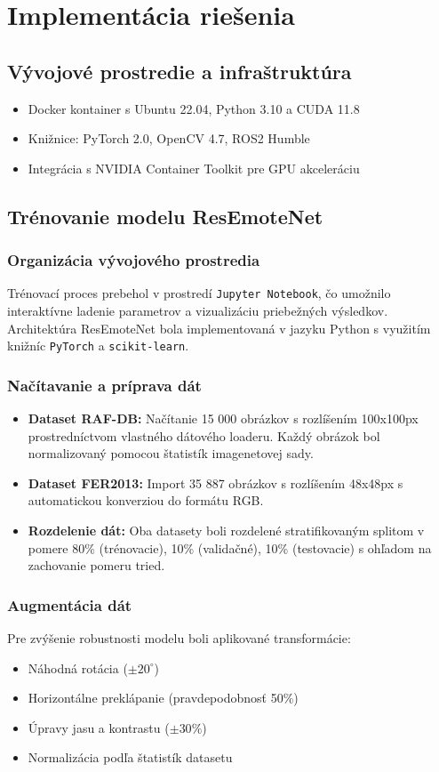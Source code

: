 \section{Implementácia riešenia}
\label{sec:implementation}
\subsection{Vývojové prostredie a infraštruktúra}
\begin{itemize}
\item Docker kontainer s Ubuntu 22.04, Python 3.10 a CUDA 11.8
\item Knižnice: PyTorch 2.0, OpenCV 4.7, ROS2 Humble
\item Integrácia s NVIDIA Container Toolkit pre GPU akceleráciu
\end{itemize}

\subsection{Trénovanie modelu ResEmoteNet}
\subsubsection{Organizácia vývojového prostredia}
Trénovací proces prebehol v prostredí \texttt{Jupyter Notebook}, čo umožnilo interaktívne ladenie parametrov a vizualizáciu priebežných výsledkov. Architektúra ResEmoteNet bola implementovaná v jazyku Python s využitím knižníc \texttt{PyTorch} a \texttt{scikit-learn}.

\subsubsection{Načítavanie a príprava dát}
\begin{itemize}
\item \textbf{Dataset RAF-DB:} Načítanie 15 000 obrázkov s rozlíšením 100x100px prostredníctvom vlastného dátového loaderu. Každý obrázok bol normalizovaný pomocou štatistík imagenetovej sady.
\item \textbf{Dataset FER2013:} Import 35 887 obrázkov s rozlíšením 48x48px s automatickou konverziou do formátu RGB.
\item \textbf{Rozdelenie dát:} Oba datasety boli rozdelené stratifikovaným splitom v pomere 80\% (trénovacie), 10\% (validačné), 10\% (testovacie) s ohľadom na zachovanie pomeru tried.
\end{itemize}

\subsubsection{Augmentácia dát}
Pre zvýšenie robustnosti modelu boli aplikované transformácie:
\begin{itemize}
    \item Náhodná rotácia ($\pm 20^\circ$)
    \item Horizontálne preklápanie (pravdepodobnosť 50\%)
    \item Úpravy jasu a kontrastu ($\pm 30\%$)
    \item Normalizácia podľa štatistík datasetu
\end{itemize}

